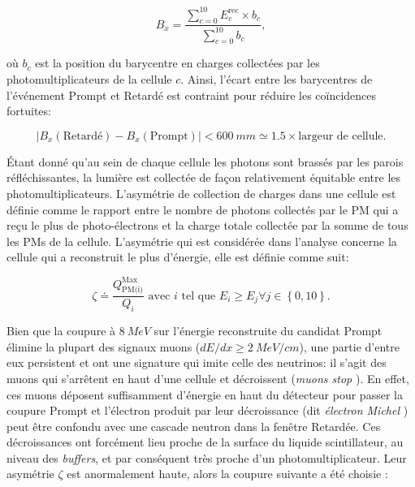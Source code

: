 \begin{equation}
    B_x = \frac{\sum_{c = 0}^{10} E^\textrm{rec}_c \times b_c}{\sum_{c = 0}^{10} b_c},
\end{equation}

\bigbreak

où $b_c$ est la position du barycentre en charges collectées par les photomultiplicateurs de la cellule $c$. Ainsi, l'écart entre les barycentres de l'événement Prompt et Retardé est contraint pour réduire les coïncidences fortuites:

\begin{equation}
    | B_x(\textrm{Retardé}) - B_x(\textrm{Prompt})| < \SI{600}{mm} \simeq 1.5 \times \textrm{largeur de cellule}.
\end{equation}

\bigbreak

Étant donné qu'au sein de chaque cellule les photons sont brassés par les parois réfléchissantes, la lumière est collectée de façon relativement équitable entre les photomultiplicateurs. L'asymétrie de collection de charges dans une cellule est définie comme le rapport entre le nombre de photons collectés par le PM qui a reçu le plus de photo-électrons et la charge totale collectée par la somme de tous les PMs de la cellule. L'asymétrie qui est considérée dans l'analyse concerne la cellule qui a reconstruit le plus d'énergie, elle est définie comme suit:

\begin{equation}
    \zeta \doteq \frac{Q_{\textrm{PM(i)}}^\textrm{Max}}{Q_i} \textrm{ avec } i \textrm{ tel que } E_i \geq E_j \forall j \in \left\{ 0, 10\right\}.
\end{equation}

\bigbreak

Bien que la coupure à $\SI{8}{MeV}$ sur l'énergie reconstruite du candidat Prompt élimine la plupart des signaux muons ($dE/dx \geq \SI{2}{MeV/cm}$), une partie d'entre eux persistent et ont une signature qui imite celle des neutrinos: il s'agit des muons qui s'arrêtent en haut d'une cellule et décroissent (\og \textit{muons stop} \fg{}). En effet, ces muons déposent suffisamment d'énergie en haut du détecteur pour passer la coupure Prompt et l'électron produit par leur décroissance (dit \og \textit{électron Michel} \fg{} \cite{Michel:1949qe}) peut être confondu avec une cascade neutron dans la fenêtre Retardée. Ces décroissances ont forcément lieu proche de la surface du liquide scintillateur, au niveau des \textit{buffers}, et par conséquent très proche d'un photomultiplicateur. Leur asymétrie $\zeta$ est anormalement haute, alors la coupure suivante a été choisie :

